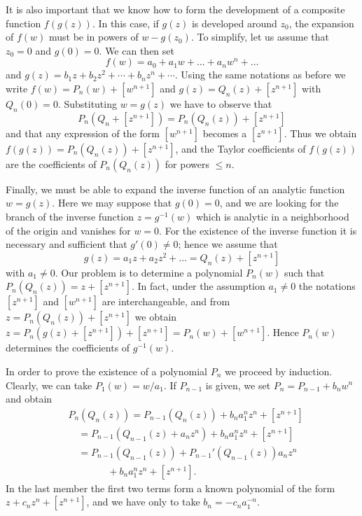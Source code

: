 It is also important that we know how to form the development of a composite function $f(g(z))$. In this case, if $g(z)$ is developed around $z_{0}$, the expansion of $f(w)$ must be in powers of $w - g(z_{0})$. To simplify, let us assume that $z_{0} = 0$ and $g(0) = 0$. We can then set
\begin{equation*}
f (w) = a _ {0} + a _ {1} w + \dots + a _ {n} w ^ {n} + \dots
\end{equation*}
and $g(z) = b_{1}z + b_{2}z^{2} + \cdots + b_{n}z^{n} + \cdots$. Using the same notations as before we write $f(w) = P_{n}(w) + [w^{n+1}]$ and $g(z) = Q_{n}(z) + [z^{n+1}]$ with $Q_{n}(0) = 0$. Substituting $w = g(z)$ we have to observe that
\begin{equation*}
P _ {n} (Q _ {n} + [ z ^ {n + 1} ]) = P _ {n} (Q _ {n} (z)) + [ z ^ {n + 1} ]
\end{equation*}
and that any expression of the form $[w^{n+1}]$ becomes a $[z^{n+1}]$. Thus we obtain $f(g(z)) = P_{n}(Q_{n}(z)) + [z^{n+1}]$, and the Taylor coefficients of $f(g(z))$ are the coefficients of $P_{n}(Q_{n}(z))$ for powers $\leq n$.

Finally, we must be able to expand the inverse function of an analytic function $w = g(z)$. Here we may suppose that $g(0) = 0$, and we are looking for the branch of the inverse function $z = g^{-1}(w)$ which is analytic in a neighborhood of the origin and vanishes for $w = 0$. For the existence of the inverse function it is necessary and sufficient that $g'(0) \neq 0$; hence we assume that
\begin{equation*}
g (z) = a _ {1} z + a _ {2} z ^ {2} + \dots = Q _ {n} (z) + [ z ^ {n + 1} ]
\end{equation*}
with $a_1 \neq 0$. Our problem is to determine a polynomial $P_n(w)$ such that $P_n(Q_n(z)) = z + [z^{n+1}]$. In fact, under the assumption $a_1 \neq 0$ the notations $[z^{n+1}]$ and $[w^{n+1}]$ are interchangeable, and from $z = P_n(Q_n(z)) + [z^{n+1}]$ we obtain $z = P_n(g(z) + [z^{n+1}]) + [z^{n+1}] = P_n(w) + [w^{n+1}]$. Hence $P_n(w)$ determines the coefficients of $g^{-1}(w)$.

In order to prove the existence of a polynomial $P_{n}$ we proceed by induction. Clearly, we can take $P_{1}(w) = w/a_{1}$. If $P_{n-1}$ is given, we set $P_{n} = P_{n-1} + b_{n}w^{n}$ and obtain
\begin{equation*}
\begin{aligned}
&P_n(Q_n(z))=P_{n-1}(Q_n(z))+b_na_1^nz^n+[z^{n+1}]\\
&\quad=P_{n-1}(Q_{n-1}(z)+a_nz^n)+b_na_1^nz^n+[z^{n+1}]\\
&\quad=P_{n-1}(Q_{n-1}(z))+P_{n-1}'(Q_{n-1}(z))a_nz^n\\
&\qquad\qquad+b_na_1^nz^n+[z^{n+1}].
\end{aligned}
\end{equation*}
In the last member the first two terms form a known polynomial of the form $z + c_{n}z^{n} + [z^{n+1}]$, and we have only to take $b_{n} = -c_{n}a_{1}^{-n}$.

